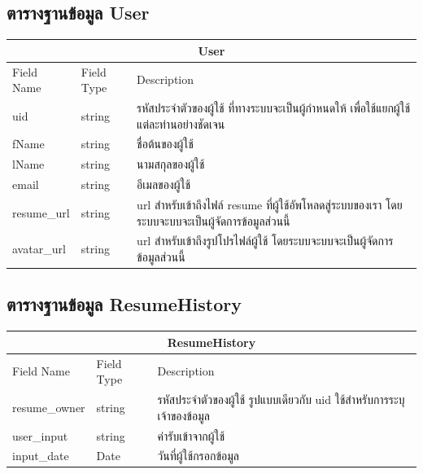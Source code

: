 \subsection{ตารางฐานข้อมูล User}
\begin{table}[H]
    \begin{tabular*}{\textwidth}{l|l|p{}}
        \hline
        \multicolumn{3}{c}{User}                                                                                                      \\ \hline
        Field Name  & Field Type & Description                                                                                        \\ \hline
        uid         & string     & รหัสประจำตัวของผู้ใช้ ที่ทางระบบจะเป็นผู้กำหนดให้ เพื่อใช้แยกผู้ใช้แต่ละท่านอย่างชัดเจน            \\
        fName       & string     & ชื่อต้นของผู้ใช้                                                                                   \\
        lName       & string     & นามสกุลของผู้ใช้                                                                                   \\
        email       & string     & อีเมลของผู้ใช้                                                                                     \\
        resume\_url & string     & url สำหรับเข้าถึงไฟล์ resume ที่ผู้ใช้อัพโหลดสู่ระบบของเรา โดยระบบจะบบจะเป็นผู้จัดการข้อมูลส่วนนี้ \\
        avatar\_url & string     & url สำหรับเข้าถึงรูปโปรไฟล์ผู้ใช้ โดยระบบจะบบจะเป็นผู้จัดการข้อมูลส่วนนี้                          \\ \hline
    \end{tabular*}
\end{table}

\subsection{ตารางฐานข้อมูล ResumeHistory}
\begin{table}[H]
    \begin{tabular*}{\textwidth}{l|l|p{}}
        \hline
        \multicolumn{3}{c}{ResumeHistory}                                                                   \\\hline
        Field Name    & Field Type & Description                                                            \\\hline
        resume\_owner & string     & รหัสประจำตัวของผู้ใช้ รูปแบบเดียวกับ uid ใช้สำหรับการระบุเจ้าของข้อมูล \\
        user\_input   & string     & ค่ารับเข้าจากผู้ใช้                                                    \\
        input\_date   & Date       & วันที่ผู้ใช้กรอกข้อมูล \\ \hline
    \end{tabular*}
\end{table}

